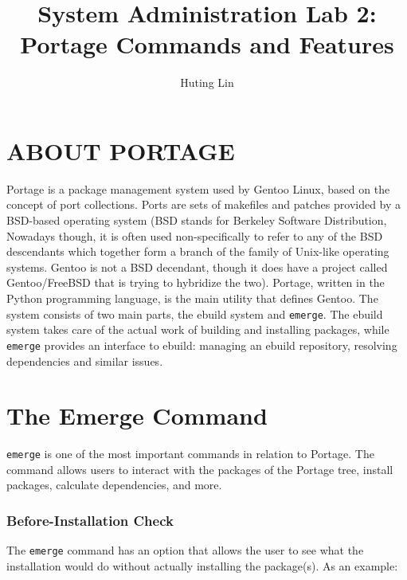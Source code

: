 \documentclass[11pt]{article}
\title{System Administration Lab 2: Portage Commands and Features\vspace{-2ex}}
\author{Huting Lin}
\date{}
\begin{document}
\maketitle

\section*{ABOUT PORTAGE}

Portage is a package management system used by Gentoo Linux, based on the concept of port collections. Ports are sets of makefiles and patches provided by a BSD-based operating system (BSD stands for Berkeley Software Distribution, Nowadays though, it is often used non-specifically to refer to any of the BSD descendants which together form a branch of the family of Unix-like operating systems. Gentoo is not a BSD decendant, though it does have a project called Gentoo/FreeBSD that is trying to hybridize the two). Portage, written in the Python programming language, is the main utility that defines Gentoo. The system consists of two main parts, the ebuild system and \verb|emerge|. The ebuild system takes care of the actual work of building and installing packages, while \verb|emerge| provides an interface to ebuild: managing an ebuild repository, resolving dependencies and similar issues.

\section*{The Emerge Command}

\verb|emerge| is one of the most important commands in relation to Portage. The command allows users to interact with the packages of the Portage tree, install packages, calculate dependencies, and more.

\subsubsection*{Before-Installation Check}

The \verb|emerge| command has an option that allows the user to see what the installation would do without actually installing the package(s). As an example:
\end{document}
